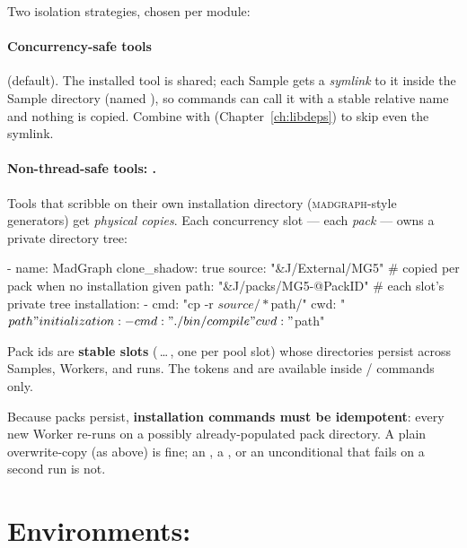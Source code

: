 Two isolation strategies, chosen per module:

\paragraph{Concurrency-safe tools} (default). The installed tool is shared; each Sample
gets a \emph{symlink} to it inside the Sample directory (named ),
so commands can call it with a stable relative name and nothing is copied. Combine with
 (Chapter~\ref{ch:libdeps}) to skip even the
symlink.

\paragraph{Non-thread-safe tools: .} Tools that scribble on
their own installation directory (\textsc{madgraph}-style generators) get \emph{physical
copies}. Each concurrency slot --- each \emph{pack} --- owns a private directory tree:

\begin{yamlwin}
- name: MadGraph
  clone_shadow: true
  source: "&J/External/MG5"          # copied per pack when no installation given
  path: "&J/packs/MG5-@PackID"       # each slot's private tree
  installation:
    - cmd: "cp -r ${source}/* ${path}/"
      cwd: "${path}"
  initialization:
    - cmd: "./bin/compile"
      cwd: "${path}"
\end{yamlwin}

Pack ids are \textbf{stable slots} (\,\ldots\,, one per pool slot)
whose directories persist across Samples, Workers, and runs. The tokens
 and  are available inside
 /  commands only.

\begin{jwarn}
Because packs persist, \textbf{installation commands must be idempotent}: every new
Worker re-runs  on a possibly already-populated pack directory. A
plain overwrite-copy (as above) is fine; an , a , or an
unconditional  that fails on a second run is not.
\end{jwarn}

\section{Environments: }
\label{sec:env-setup}

